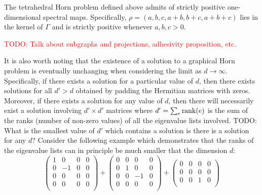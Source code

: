 \documentclass[notitlepage, 10pt]{article}
\begin{document}
\begin{exam}
    The tetrahedral Horn problem defined above admits of strictly positive one-dimensional spectral maps.
    Specifically, $\rho = (a,b,c,a+b,b+c,a+b+c)$ lies in the kernel of $\Gamma$ and is strictly positive whenever $a,b,c > 0$.
\end{exam}

\textcolor{red}{TODO: Talk about subgraphs and projections, adhesivity proposition, etc.}

\begin{rem}
    It is also worth noting that the existence of a solution to a graphical Horn problem is eventually unchanging when considering the limit as $d \to \infty$.
    Specifically, if there exists a solution for a particular value of $d$, then there exists solutions for all $d' > d$ obtained by padding the Hermitian matrices with zeros.
    Moreover, if there exists a solution for any value of $d$, then there will necessarily exist a solution involving $d'\times d'$ matrices where $d' = \sum_{e} \operatorname{rank}(e)$ is the sum of the ranks (number of non-zero values) of all the eigenvalue lists involved.
    {\color{red}
        TODO: What is the smallest value of $d'$ which contains a solution is there is a solution for any $d$? Consider the following example which demonstrates that the ranks of the eigenvalue lists can in principle be much smaller that the dimension $d$:
        \begin{equation}
            \begin{pmatrix}
                1 & 0 & 0 & 0 \\
                0 & -1 & 0 & 0 \\
                0 & 0 & 0 & 0 \\
                0 & 0 & 0 & 0 \\
            \end{pmatrix}
            +
            \begin{pmatrix}
                0 & 0 & 0 & 0 \\
                0 & 1 & 0 & 0 \\
                0 & 0 & -1 & 0 \\
                0 & 0 & 0 & 0 \\
            \end{pmatrix}
            +
            \begin{pmatrix}
                0 & 0 & 0 & 0 \\
                0 & 0 & 0 & 0 \\
                0 & 0 & 1 & 0 \\

\end{pmatrix}
\end{equation}}
\end{rem}
\end{document}
